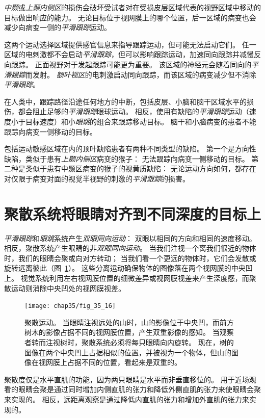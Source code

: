 \textit{中颞}或\textit{上颞内侧区}的损伤会破坏受试者对在受损皮层区域代表的视野区域中移动的目标做出响应的能力。
无论目标位于视网膜上的哪个位置，后一区域的病变也会减少向病变一侧的\textit{平滑跟踪}运动。


这两个运动选择区域提供感官信息来指导跟踪运动，但可能无法启动它们。
任一区域的电刺激都不会启动\textit{平滑跟踪}，但可以影响跟踪运动，加速同向跟踪并减慢反向跟踪。
正面视野对于发起跟踪可能更为重要。
该区域的神经元会随着同向的\textit{平滑跟踪}而发射。
\textit{额叶视区}的电刺激启动同向跟踪，而该区域的病变减少但不消除\textit{平滑跟踪}。


在人类中，跟踪路径沿途任何地方的中断，包括皮层、小脑和脑干区域水平的损伤，都会阻止足够的\textit{平滑跟踪}眼球运动。
相反，使用有缺陷的\textit{平滑跟踪}运动（速度小于目标速度）和小\textit{眼跳}的组合来跟踪移动目标。
脑干和小脑病变的患者不能跟踪向病变一侧移动的目标。


包括运动敏感区域在内的顶叶缺陷患者有两种不同类型的缺陷。
第一个是方向性缺陷，类似于患有\textit{上颞内侧区}病变的猴子：
无法跟踪向病变一侧移动的目标。
第二种是类似于患有中颞区病变的猴子的视黄质缺陷：
无论运动方向如何，都存在对仅限于病变对面的视觉半视野的刺激的\textit{平滑跟踪}的损害。



\section{聚散系统将眼睛对齐到不同深度的目标上}

\textit{平滑跟踪}和\textit{眼跳}系统产生\textit{双眼同向运动}：
双眼以相同的方向和相同的速度移动。
相反，聚散系统产生眼睛的非\textit{双眼同向运动}。
当我们注视一个离我们很近的物体时，我们的眼睛会聚或向对方转动；
当我们看一个更远的物体时，它们会发散或旋转远离彼此（图~\ref{fig:35_16}）。
这些分离运动确保物体的图像落在两个视网膜的中央凹上。
视觉系统利用左右视网膜位置的细微差异或视网膜视差来产生深度感，而聚散运动则消除中央凹处的视网膜视差。


\begin{figure}[htbp]
	\centering
	\texttt{[image: chap35/fig\_35\_16]}
	\caption{聚散运动。
		当眼睛注视远处的山时，山的影像位于中央凹，而前方树木的影像占据不同的视网膜位置，产生双重影像的感知。
		当观察者转而注视树时，聚散系统必须将每只眼睛向内旋转。
		现在，树的图像在两个中央凹上占据相似的位置，并被视为一个物体，但山的图像在视网膜上占据不同的位置，看起来是双重的。}
	\label{fig:35_16}
\end{figure}


聚散度仅是水平直肌的功能，因为两只眼睛是水平而非垂直移位的。
用于近场观看的眼睛会聚是通过同时增加内侧直肌的张力和降低外侧直肌的张力来使眼睛会聚来实现的。
相反，远距离观察是通过降低内直肌的张力和增加外直肌的张力来实现的。


